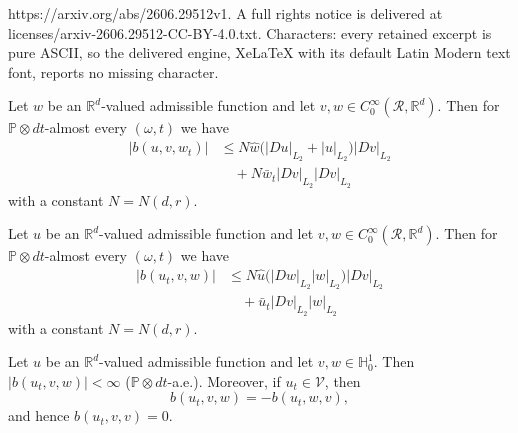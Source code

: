 \documentclass[10pt,a4paper]{amsart}
\newcommand\bH{\mathbb{H}}
\newcommand\bR{\mathbb{R}}
\newcommand\cR{\mathcal{R}}
\newcommand{\R}{\mathbb{R}}
\renewcommand{\P}{\mathbb{P}}
\begin{document}
https://arxiv.org/abs/2606.29512v1. A full rights notice is delivered at licenses/arxiv-2606.29512-CC-BY-4.0.txt. Characters: every retained excerpt is pure ASCII, so the delivered engine, XeLaTeX with its default Latin Modern text font, reports no missing character.
\begin{proposition}
                             \label{proposition1}
Let $w$ be an $\R^d$-valued admissible function and let
$v,w\in C_0^{\infty}(\cR,\bR^d)$. 
Then for $\P\otimes dt$-almost every $(\omega,t)$
we have 
\begin{align}
|b(u,v,w_t)|
&\leq N\hat w \big(|Du|_{L_2}+|u|_{L_2}\big)|Dv|_{L_2}  \nonumber\\
&\quad+N\bar w_t|Dv|_{L_2}|Dv|_{L_2}             \nonumber
\end{align}
with a constant $N=N(d,r)$. 
\end{proposition}

\begin{proposition}
                             \label{proposition2}
Let $u$ be an $\R^d$-valued admissible function and let
$v,w\in C^{\infty}_0(\cR,\bR^d)$. 
Then for $\P\otimes dt$-almost every $(\omega,t)$ we have 
\begin{align}
|b(u_t,v,w)|&\leq N\hat u \big(|Dw|_{L_2}|w|_{L_2}\big)|Dv|_{L_2}  
                                                                                  \nonumber\\
&\quad+\bar u_t|Dv|_{L_2}|w|_{L_2}                         \nonumber
\end{align}
with a constant $N=N(d,r)$. 
\end{proposition}

\begin{proposition}
                            \label{proposition antisymmetry}
Let $u$ be an $\mathbb R^d$-valued admissible function and let
$v,w\in \bH^1_0$. 
Then $|b(u_t,v,w)|<\infty$ \rm{($\P\otimes dt$-a.e.)}. 
Moreover, if $u_t\in\mathcal V$, 
then
\begin{equation*}
b(u_t,v,w)=-b(u_t,w,v), 
\end{equation*}
and hence $b(u_t,v,v)=0$. 
\end{proposition}
\end{document}
